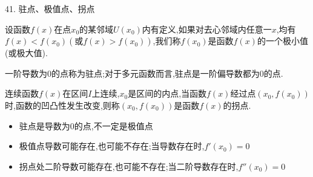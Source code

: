 41. 驻点、极值点、拐点
\begin{definition}[极值点]
	设函数$f(x)$在点$x_{0}$的某邻域$U(x_{0})$内有定义,如果对去心邻域内任意一$x$,均有$f(x)<f(x_{0})(\text{或}f(x)>f(x_{0}))$,我们称$f(x_{0})$是函数$f(x)$的一个极小值(或极大值).
\end{definition}
\begin{definition}[驻点]
	一阶导数为$0$的点称为驻点;对于多元函数而言,驻点是一阶偏导数都为$0$的点.
\end{definition}
\begin{definition}[拐点]
	连续函数$f(x)$在区间$I$上连续,$x_{0}$是区间的内点,当函数$f(x)$经过点$(x_{0},f(x_{0}))$时,函数的凹凸性发生改变,则称$(x_{0},f(x_{0}))$是函数$f(x)$的拐点.
\end{definition}
\begin{anymark}[注]
	\begin{itemize}
		\item 驻点是导数为$0$的点,不一定是极值点
		\item 极值点导数可能存在,也可能不存在;当导数存在时,$f'(x_{0})=0$
		\item 拐点处二阶导数可能存在,也可能不存在;当二阶导数存在时,$f''(x_{0})=0$
	\end{itemize}
\end{anymark}

